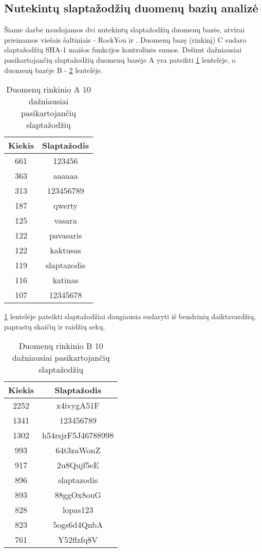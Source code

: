 \documentclass{VUMIFInfBakalaurinis}
\begin{document}
\subsection{Nutekintų slaptažodžių duomenų bazių analizė} \label{sec:db-analize}
Šiame darbe naudojamos dvi nutekintų slaptažodžių duomenų bazės, atvirai 
prieinamos viešais šaltiniais - RockYou ir . Duomenų bazę (rinkinį) C sudaro 
slaptažodžių SHA-1 maišos funkcijos kontrolinės sumos. Dešimt dažniausiai 
pasikartojančių slaptažodžių duomenų bazėje A yra pateikti \ref{10-dazn-slapt-a} 
lentelėje, o duomenų bazėje B - \ref{10-dazn-slapt-b} lentelėje.

\begin{table}[hb]
\centering
\begin{tabular}{|c|c|}
  \hline
  Kiekis & Slaptažodis \\
  \hline
  661 & 123456 \\
  363 & aaaaaa \\
  313 & 123456789 \\
  187 & qwerty \\
  125 & vasara \\
  122 & pavasaris \\
  122 & kaktusas \\
  119 & slaptazodis \\
  116 & katinas \\
  107 & 12345678 \\
  \hline
\end{tabular}
\caption{Duomenų rinkinio A 10 dažniausiai pasikartojančių slaptažodžių}
\label{10-dazn-slapt-a}
\end{table}

\ref{10-dazn-slapt-a} lentelėje pateikti slaptažodžiai daugiausia sudaryti iš 
bendrinių daiktavardžių, paprastų skaičių ir raidžių sekų.

\begin{table}[ht]
\centering
\begin{tabular}{|c|c|}
  \hline
  Kiekis & Slaptažodis \\
  \hline
  2252 & x4ivygA51F \\
  1341 & 123456789 \\
  1302 & h54rsjrF5J46788998 \\
  993 & 64t3zaWonZ \\
  917 & 2u8Qujf5eE \\
  896 & slaptazodis \\
  893 & 88ggOx8ouG \\
  828 & lopas123 \\
  823 & 5ogs6d4QnbA \\
  761 & Y52flzfq8V \\
  \hline
\end{tabular}
\caption{Duomenų rinkinio B 10 dažniausiai pasikartojančių slaptažodžių}
\label{10-dazn-slapt-b}
\end{table}
\end{document}
